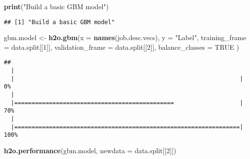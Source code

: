 \documentclass[]{article}
\newenvironment{Shaded}{\begin{snugshade}}{\end{snugshade}}
\newcommand{\KeywordTok}[1]{\textcolor[rgb]{0.13,0.29,0.53}{\textbf{{#1}}}}
\newcommand{\DataTypeTok}[1]{\textcolor[rgb]{0.13,0.29,0.53}{{#1}}}
\newcommand{\DecValTok}[1]{\textcolor[rgb]{0.00,0.00,0.81}{{#1}}}
\newcommand{\StringTok}[1]{\textcolor[rgb]{0.31,0.60,0.02}{{#1}}}
\newcommand{\OtherTok}[1]{\textcolor[rgb]{0.56,0.35,0.01}{{#1}}}
\newcommand{\NormalTok}[1]{{#1}}
\begin{document}
\begin{Shaded}
\begin{Highlighting}[]
\KeywordTok{print}\NormalTok{(}\StringTok{"Build a basic GBM model"}\NormalTok{)}
\end{Highlighting}
\end{Shaded}

\begin{verbatim}
## [1] "Build a basic GBM model"
\end{verbatim}

\begin{Shaded}
\begin{Highlighting}[]
\NormalTok{gbm.model <-}\StringTok{ }\KeywordTok{h2o.gbm}\NormalTok{(}\DataTypeTok{x =} \KeywordTok{names}\NormalTok{(job.desc.vecs),}
                     \DataTypeTok{y =} \StringTok{"Label"}\NormalTok{,}
                     \DataTypeTok{training_frame =} \NormalTok{data.split[[}\DecValTok{1}\NormalTok{]],}
                     \DataTypeTok{validation_frame =} \NormalTok{data.split[[}\DecValTok{2}\NormalTok{]], }
                     \DataTypeTok{balance_classes =} \OtherTok{TRUE}
                     \NormalTok{)}
\end{Highlighting}
\end{Shaded}

\begin{verbatim}
## 
  |                                                                       
  |                                                                 |   0%
  |                                                                       
  |==============================================                   |  70%
  |                                                                       
  |=================================================================| 100%
\end{verbatim}

\begin{Shaded}
\begin{Highlighting}[]
\KeywordTok{h2o.performance}\NormalTok{(gbm.model, }\DataTypeTok{newdata =} \NormalTok{data.split[[}\DecValTok{2}\NormalTok{]])}
\end{Highlighting}
\end{Shaded}
\end{document}
